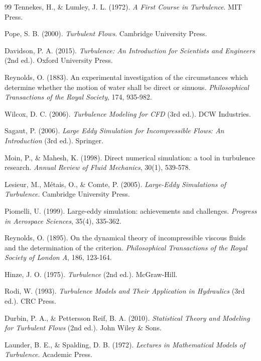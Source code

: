 \begin{thebibliography}{99}
Tennekes, H., \& Lumley, J. L. (1972). \emph{A First Course in Turbulence}. MIT Press.

Pope, S. B. (2000). \emph{Turbulent Flows}. Cambridge University Press.

Davidson, P. A. (2015). \emph{Turbulence: An Introduction for Scientists and Engineers} (2nd ed.). Oxford University Press.

Reynolds, O. (1883). An experimental investigation of the circumstances which determine whether the motion of water shall be direct or sinuous. \emph{Philosophical Transactions of the Royal Society}, 174, 935-982.

Wilcox, D. C. (2006). \emph{Turbulence Modeling for CFD} (3rd ed.). DCW Industries.

Sagaut, P. (2006). \emph{Large Eddy Simulation for Incompressible Flows: An Introduction} (3rd ed.). Springer.

Moin, P., \& Mahesh, K. (1998). Direct numerical simulation: a tool in turbulence research. \emph{Annual Review of Fluid Mechanics}, 30(1), 539-578.

Lesieur, M., Métais, O., \& Comte, P. (2005). \emph{Large-Eddy Simulations of Turbulence}. Cambridge University Press.

Piomelli, U. (1999). Large-eddy simulation: achievements and challenges. \emph{Progress in Aerospace Sciences}, 35(4), 335-362.

Reynolds, O. (1895). On the dynamical theory of incompressible viscous fluids and the determination of the criterion. \emph{Philosophical Transactions of the Royal Society of London A}, 186, 123-164.

Hinze, J. O. (1975). \emph{Turbulence} (2nd ed.). McGraw-Hill.

Rodi, W. (1993). \emph{Turbulence Models and Their Application in Hydraulics} (3rd ed.). CRC Press.

Durbin, P. A., \& Pettersson Reif, B. A. (2010). \emph{Statistical Theory and Modeling for Turbulent Flows} (2nd ed.). John Wiley \& Sons.

Launder, B. E., \& Spalding, D. B. (1972). \emph{Lectures in Mathematical Models of Turbulence}. Academic Press.


\end{thebibliography}
